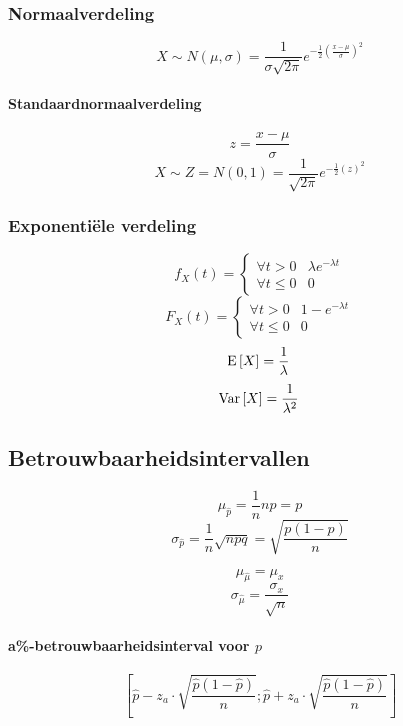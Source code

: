 \subsubsection{Normaalverdeling}
\label{sec:Normaalverdeling}
  \[
    X \sim N\left(\mu,\sigma\right) = \frac{1}{\sigma\sqrt{2\pi}}e^{-\frac{1}{2}\left(\frac{x-\mu}{\sigma}\right)^2}
  \]
  \paragraph{Standaardnormaalverdeling}
  \[
    z = \frac{x-\mu}{\sigma}
  \]
  \[
    X \sim Z = N\left(0,1\right) = \frac{1}{\sqrt{2\pi}}e^{-\frac{1}{2}\left(z\right)^2}
  \]

  \subsubsection{Exponentiële verdeling}
  \[
    f_X(t) =
    \left\{
      \begin{array}{ll}
        \forall t > 0 & \lambda e^{- \lambda t}\\
        \forall t \leq 0 & 0
      \end{array}
    \right.
  \]
  \[
    F_X(t) =
    \left\{
      \begin{array}{ll}
        \forall t > 0 & 1 - e^{- \lambda t}\\
        \forall t \leq 0 & 0
      \end{array}
    \right.
  \]
  \[
    \!\mathrm{E}\left[ X \right] = \frac{1}{\lambda}
  \]
  \[
    \!\mathrm{Var}\left[ X \right] = \frac{1}{\lambda^2}
  \]

\subsection{Betrouwbaarheidsintervallen}
\label{sec:Betrouwbaarheidsintervallen}
  \[
    \mu_{\hat{p}} = \frac{1}{n}np = p
  \]
  \[
    \sigma_{\hat{p}} = \frac{1}{n}\sqrt{npq} = \sqrt{\frac{p\left(1-p\right)}{n}}
  \]

  \[
    \mu_{\hat{\mu}} = \mu_x
  \]
  \[
    \sigma_{\hat{\mu}} = \frac{\sigma_x}{\sqrt{n}}
  \]

  \paragraph{a\%-betrouwbaarheidsinterval voor $p$}
  \label{sec:aBetrouwbaarheidsintervalVoorP}
  \[
    \left[\hat{p}-z_a\cdot\sqrt{\frac{\hat{p}\left(1-\hat{p}\right)}{n}};
      \hat{p}+z_a\cdot\sqrt{\frac{\hat{p}\left(1-\hat{p}\right)}{n}}\right]
  \]

